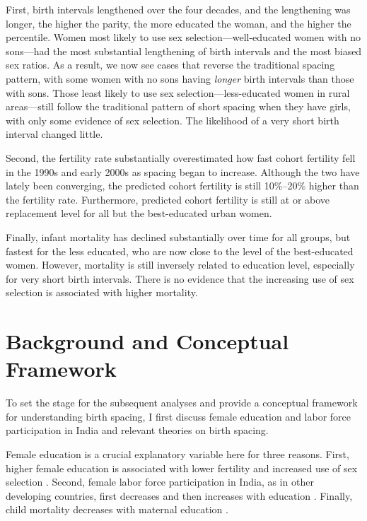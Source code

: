 \documentclass[12pt,letterpaper]{article}
\begin{document}
First, birth intervals lengthened over the four decades, and the lengthening was longer, 
the higher the parity, the more educated the woman, and the higher the percentile. 
Women most likely to use sex selection---well-educated women with no sons---had the most 
substantial lengthening of birth intervals and the most biased sex ratios. 
As a result, we now see cases that reverse the traditional spacing pattern, with some 
women with no sons having \emph{longer} birth intervals than those with sons. 
Those least likely to use sex selection---less-educated women in rural areas---still follow the 
traditional pattern of short spacing when they have girls, with only some evidence of sex 
selection. 
The likelihood of a very short birth interval changed little. 

Second, the fertility rate substantially overestimated how fast cohort fertility fell in the 
1990s and early 2000s as spacing began to increase. 
Although the two have lately been converging, the predicted cohort fertility is still 
10\%--20\% higher than the fertility rate. 
Furthermore, predicted cohort fertility is still at or above replacement level for all but 
the best-educated urban women. 

Finally, infant mortality has declined substantially over time for all groups, but fastest 
for the less educated, who are now close to the level of the best-educated women. 
However, mortality is still inversely related to education level, especially for very short 
birth intervals. 
There is no evidence that the increasing use of sex selection is associated with higher mortality.




\section{Background and Conceptual Framework}

To set the stage for the subsequent analyses and provide a conceptual framework for 
understanding birth spacing, I first discuss female education and labor force 
participation in India and relevant theories on birth spacing.


Female education is a crucial explanatory variable here for three reasons.
First, higher female education is associated with lower fertility and increased use of 
sex selection
\citep{das_gupta97,dreze01,bhat03,retherford03b,Guilmoto2009a,Portner2015b,Jayachandran2017}.
Second, female labor force participation in India, as in other developing countries, 
first decreases and then increases with education
\citep{Klasen2015,Fletcher2017,Afridi2018,Bhargava2018,Chatterjee2018,Bhargava2019}.
Finally, child mortality decreases with maternal education
\citep{Rosenzweig1982a,Whitworth2002,Maitra2008}.
\end{document}
